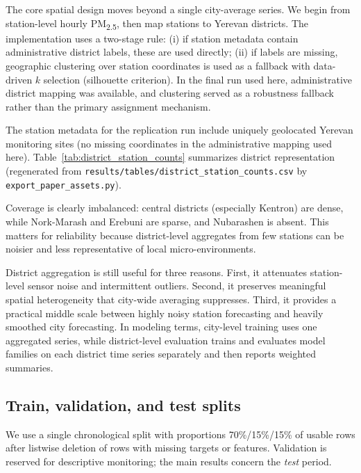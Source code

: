 \documentclass[11pt,a4paper]{article}
\begin{document}
The core spatial design moves beyond a single city-average series. We begin from station-level hourly PM\textsubscript{2.5}, then map stations to Yerevan districts. The implementation uses a two-stage rule: (i) if station metadata contain administrative district labels, these are used directly; (ii) if labels are missing, geographic clustering over station coordinates is used as a fallback with data-driven $k$ selection (silhouette criterion). In the final run used here, administrative district mapping was available, and clustering served as a robustness fallback rather than the primary assignment mechanism.

The station metadata for the replication run include uniquely geolocated Yerevan monitoring sites (no missing coordinates in the administrative mapping used here). Table~\ref{tab:district_station_counts} summarizes district representation (regenerated from \texttt{results/tables/district\_station\_counts.csv} by \texttt{export\_paper\_assets.py}).



Coverage is clearly imbalanced: central districts (especially Kentron) are dense, while Nork-Marash and Erebuni are sparse, and Nubarashen is absent. This matters for reliability because district-level aggregates from few stations can be noisier and less representative of local micro-environments.

District aggregation is still useful for three reasons. First, it attenuates station-level sensor noise and intermittent outliers. Second, it preserves meaningful spatial heterogeneity that city-wide averaging suppresses. Third, it provides a practical middle scale between highly noisy station forecasting and heavily smoothed city forecasting. In modeling terms, city-level training uses one aggregated series, while district-level evaluation trains and evaluates model families on each district time series separately and then reports weighted summaries.

\subsection{Train, validation, and test splits}

We use a single chronological split with proportions 70\%/15\%/15\% of usable rows after listwise deletion of rows with missing targets or features. Validation is reserved for descriptive monitoring; the main results concern the \emph{test} period.
\end{document}
